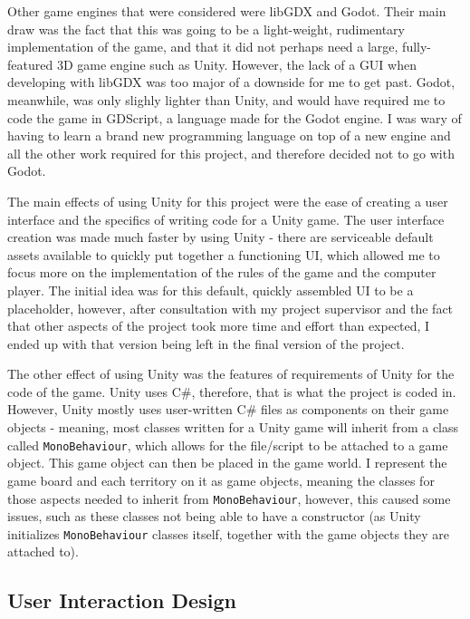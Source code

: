 Other game engines that were considered were libGDX and Godot. Their main draw was the fact that this was going to be a light-weight, rudimentary implementation of the game, and that it did not perhaps need a large, fully-featured 3D game engine such as Unity. However, the lack of a GUI when developing with libGDX was too major of a downside for me to get past. Godot, meanwhile, was only slighly lighter than Unity, and would have required me to code the game in GDScript, a language made for the Godot engine. I was wary of having to learn a brand new programming language on top of a new engine and all the other work required for this project, and therefore decided not to go with Godot.

The main effects of using Unity for this project were the ease of creating a user interface and the specifics of writing code for a Unity game. The user interface creation was made much faster by using Unity - there are serviceable default assets available to quickly put together a functioning UI, which allowed me to focus more on the implementation of the rules of the game and the computer player. The initial idea was for this default, quickly assembled UI to be a placeholder, however, after consultation with my project supervisor and the fact that other aspects of the project took more time and effort than expected, I ended up with that version being left in the final version of the project.

The other effect of using Unity was the features of requirements of Unity for the code of the game. Unity uses C\#, therefore, that is what the project is coded in. However, Unity mostly uses user-written C\# files as components on their game objects - meaning, most classes written for a Unity game will inherit from a class called \texttt{MonoBehaviour}, which allows for the file/script to be attached to a game object. This game object can then be placed in the game world. I represent the game board and each territory on it as game objects, meaning the classes for those aspects needed to inherit from \texttt{MonoBehaviour}, however, this caused some issues, such as these classes not being able to have a constructor (as Unity initializes \texttt{MonoBehaviour} classes itself, together with the game objects they are attached to).

\subsection{User Interaction Design}
\label{userInteractionDesign}

